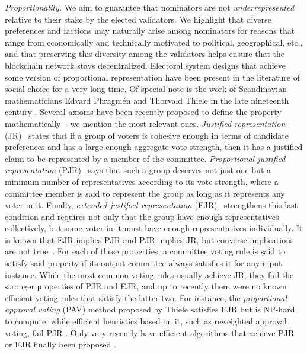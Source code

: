 \emph{Proportionality.} We aim to guarantee that nominators are not \emph{underrepresented} relative to their stake by the elected validators. We highlight that diverse preferences and factions may naturally arise among nominators for reasons that range from economically and technically motivated to political, geographical, etc., and that preserving this diversity among the validators helps ensure that the blockchain network stays decentralized. Electoral system designs that achieve some version of proportional representation have been present in the literature of social choice for a very long time. Of special note is the work of Scandinavian mathematicians Edvard Phragm\'{e}n and Thorvald Thiele in the late nineteenth century \cite{phragmen1894methode, phragmen1895proportionella, phragmen1896theorie, phragmen1899till, thiele1895om, janson2016phragmen}. 
Several axioms have been recently proposed to define the property mathematically -- we mention the most relevant ones. 
\emph{Justified representation} (JR)~\cite{aziz2017justified} states that if a group of voters is cohesive enough in terms of candidate preferences and has a large enough aggregate vote strength, then it has a justified claim to be represented by a member of the committee.
\emph{Proportional justified representation} (PJR)~\cite{sanchez2017proportional} says that such a group deserves not just one but a minimum number of representatives according to its vote strength, where a committee member is said to represent the group as long as it represents any voter in it.
Finally, \emph{extended justified representation} (EJR)~\cite{aziz2017justified} strengthens this last condition and requires not only that the group have enough representatives collectively, but some voter in it must have enough representatives individually.
It is known that EJR implies PJR and PJR implies JR, but converse implications are not true~\cite{sanchez2017proportional}. %
For each of these properties, a committee voting rule is said to satisfy said property if its output committee always satisfies it for any input instance. 
While the most common voting rules usually achieve JR, they fail the stronger properties of PJR and EJR, and up to recently there were no known efficient voting rules that satisfy the latter two. 
For instance, the \emph{proportional approval voting} (PAV) method \cite{thiele1895om, janson2016phragmen} proposed by Thiele satisfies EJR but is NP-hard to compute, while efficient heuristics based on it, such as reweighted approval voting, fail PJR \cite{aziz2014computational, skowron2016finding, aziz2017justified}. 
Only very recently have efficient algorithms that achieve PJR or EJR finally been proposed \cite{brill2017phragmen, sanchez2016maximin, aziz2018complexity, peters2019proportionality}. 

